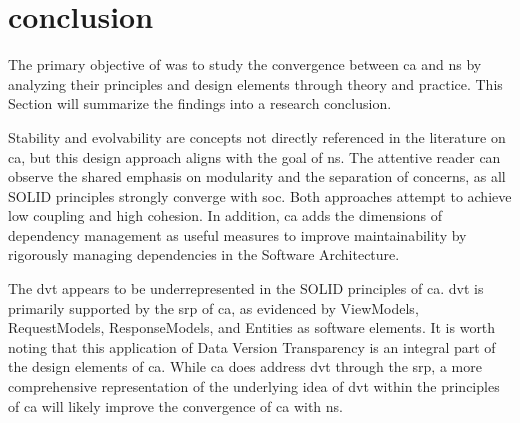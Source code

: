 \section{conclusion}

The primary objective of  was to study the
convergence between \gls{ca} and \gls{ns} by analyzing their principles and design
elements through theory and practice. This Section will summarize the findings into a
research conclusion.


Stability and evolvability are concepts not directly referenced in the literature on
\gls{ca}, but this design approach aligns with the goal of \gls{ns}. The attentive reader
can observe the shared emphasis on modularity and the separation of concerns, as all SOLID
principles strongly converge with \gls{soc}. Both approaches attempt to achieve low
coupling and high cohesion. In addition, \gls{ca} adds the dimensions of dependency
management as useful measures to improve maintainability by rigorously managing
dependencies in the Software Architecture.

The \gls{dvt} appears to be underrepresented in the SOLID principles of \gls{ca}.
\gls{dvt} is primarily supported by the \gls{srp} of \gls{ca}, as evidenced by ViewModels,
RequestModels, ResponseModels, and Entities as software elements. It is worth noting that
this application of Data Version Transparency  is an integral part of the design elements
of \gls{ca}. While \gls{ca} does address \gls{dvt} through the \gls{srp}, a more
comprehensive representation of the underlying idea of \gls{dvt} within the principles of
\gls{ca} will likely improve the convergence of \gls{ca} with \gls{ns}.


